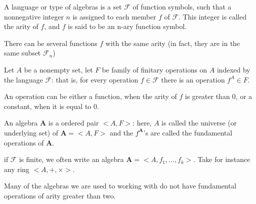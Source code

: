 \begin{definition} A language or type of
algebras is a set $\mathcal{F}$ of function symbols, such that a nonnegative
integer $n$ is assigned to each member $f$ of $\mathcal{F}$. This integer is
called the arity of $f$, and $f$ is said to be an n-ary function symbol.
\end{definition}

\begin{remark} There can be several functions $f$ with the same arity (in fact,
they are in the same subset $\mathcal{F}_n$)
\end{remark}


\begin{definition}[algebra] Let $A$ be a nonempty set, let $F$ be family of
finitary operations on $A$ indexed by the language $\mathcal{F}$: that is, for
every operation $f \in \mathcal{F}$ there is an operation $f^{A} \in F$.

  An operation can be either a function, when the arity of $f$ is greater than
$0$, or a constant, when it is equal to $0$.

  An algebra \textbf{A} is a ordered pair $<A,F>$: here, $A$ is called the
universe (or underlying set) of $\boldsymbol{A}= <A,F>$ and the
$f^{\boldsymbol{A}}$'s are called the fundamental operations of
$\boldsymbol{A}$.
\end{definition}

\begin{remark} if $\mathcal{F}$ is finite, we often write an algebra
$\boldsymbol{A} = <A, f_1,...,f_k>$. Take for instance any ring $<A,+,
\times>$.
\end{remark}

\begin{remark} Many of the algebras we are used to working with do not have
fundamental operations of arity greater than two.
\end{remark}

